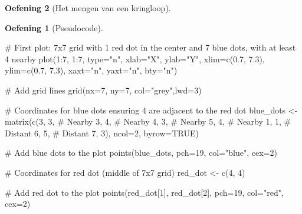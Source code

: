 \documentclass[
  a4paper,
]{scrbook}
\newenvironment{Shaded}{\begin{snugshade}}{\end{snugshade}}
\newcommand{\AttributeTok}[1]{\textcolor[rgb]{0.40,0.45,0.13}{#1}}
\newcommand{\CommentTok}[1]{\textcolor[rgb]{0.37,0.37,0.37}{#1}}
\newcommand{\ConstantTok}[1]{\textcolor[rgb]{0.56,0.35,0.01}{#1}}
\newcommand{\DecValTok}[1]{\textcolor[rgb]{0.68,0.00,0.00}{#1}}
\newcommand{\FloatTok}[1]{\textcolor[rgb]{0.68,0.00,0.00}{#1}}
\newcommand{\FunctionTok}[1]{\textcolor[rgb]{0.28,0.35,0.67}{#1}}
\newcommand{\NormalTok}[1]{\textcolor[rgb]{0.00,0.23,0.31}{#1}}
\newcommand{\OtherTok}[1]{\textcolor[rgb]{0.00,0.23,0.31}{#1}}
\newcommand{\SpecialCharTok}[1]{\textcolor[rgb]{0.37,0.37,0.37}{#1}}
\newcommand{\StringTok}[1]{\textcolor[rgb]{0.13,0.47,0.30}{#1}}
\theoremstyle{definition}
\newtheorem{exercise}{Oefening}[chapter]
\theoremstyle{remark}
\begin{document}
\begin{exercise}[Het mengen van een
kringloop]
\begin{exercise}[Pseudocode]
\begin{Shaded}
\begin{Highlighting}[]
\CommentTok{\# First plot: 7x7 grid with 1 red dot in the center and 7 blue dots, with at least 4 nearby}
\FunctionTok{plot}\NormalTok{(}\DecValTok{1}\SpecialCharTok{:}\DecValTok{7}\NormalTok{, }\DecValTok{1}\SpecialCharTok{:}\DecValTok{7}\NormalTok{, }\AttributeTok{type=}\StringTok{"n"}\NormalTok{, }\AttributeTok{xlab=}\StringTok{"X"}\NormalTok{, }\AttributeTok{ylab=}\StringTok{"Y"}\NormalTok{, }\AttributeTok{xlim=}\FunctionTok{c}\NormalTok{(}\FloatTok{0.7}\NormalTok{, }\FloatTok{7.3}\NormalTok{), }\AttributeTok{ylim=}\FunctionTok{c}\NormalTok{(}\FloatTok{0.7}\NormalTok{, }\FloatTok{7.3}\NormalTok{), }\AttributeTok{xaxt=}\StringTok{"n"}\NormalTok{, }\AttributeTok{yaxt=}\StringTok{"n"}\NormalTok{, }\AttributeTok{bty=}\StringTok{"n"}\NormalTok{)}

\CommentTok{\# Add grid lines}
\FunctionTok{grid}\NormalTok{(}\AttributeTok{nx=}\DecValTok{7}\NormalTok{, }\AttributeTok{ny=}\DecValTok{7}\NormalTok{, }\AttributeTok{col=}\StringTok{"grey"}\NormalTok{,}\AttributeTok{lwd=}\DecValTok{3}\NormalTok{)}

\CommentTok{\# Coordinates for blue dots ensuring 4 are adjacent to the red dot}
\NormalTok{blue\_dots }\OtherTok{\textless{}{-}} \FunctionTok{matrix}\NormalTok{(}\FunctionTok{c}\NormalTok{(}\DecValTok{3}\NormalTok{, }\DecValTok{3}\NormalTok{,  }\CommentTok{\# Nearby}
                      \DecValTok{3}\NormalTok{, }\DecValTok{4}\NormalTok{,  }\CommentTok{\# Nearby}
                      \DecValTok{4}\NormalTok{, }\DecValTok{3}\NormalTok{,  }\CommentTok{\# Nearby}
                      \DecValTok{5}\NormalTok{, }\DecValTok{4}\NormalTok{,  }\CommentTok{\# Nearby}
                      \DecValTok{1}\NormalTok{, }\DecValTok{1}\NormalTok{,  }\CommentTok{\# Distant}
                      \DecValTok{6}\NormalTok{, }\DecValTok{5}\NormalTok{,  }\CommentTok{\# Distant}
                      \DecValTok{7}\NormalTok{, }\DecValTok{3}\NormalTok{), }\AttributeTok{ncol=}\DecValTok{2}\NormalTok{, }\AttributeTok{byrow=}\ConstantTok{TRUE}\NormalTok{)}

\CommentTok{\# Add blue dots to the plot}
\FunctionTok{points}\NormalTok{(blue\_dots, }\AttributeTok{pch=}\DecValTok{19}\NormalTok{, }\AttributeTok{col=}\StringTok{"blue"}\NormalTok{, }\AttributeTok{cex=}\DecValTok{2}\NormalTok{)}

\CommentTok{\# Coordinates for red dot (middle of 7x7 grid)}
\NormalTok{red\_dot }\OtherTok{\textless{}{-}} \FunctionTok{c}\NormalTok{(}\DecValTok{4}\NormalTok{, }\DecValTok{4}\NormalTok{)}

\CommentTok{\# Add red dot to the plot}
\FunctionTok{points}\NormalTok{(red\_dot[}\DecValTok{1}\NormalTok{], red\_dot[}\DecValTok{2}\NormalTok{], }\AttributeTok{pch=}\DecValTok{19}\NormalTok{, }\AttributeTok{col=}\StringTok{"red"}\NormalTok{, }\AttributeTok{cex=}\DecValTok{2}\NormalTok{)}


\end{Highlighting}
\end{Shaded}
\end{exercise}
\end{exercise}
\end{document}
